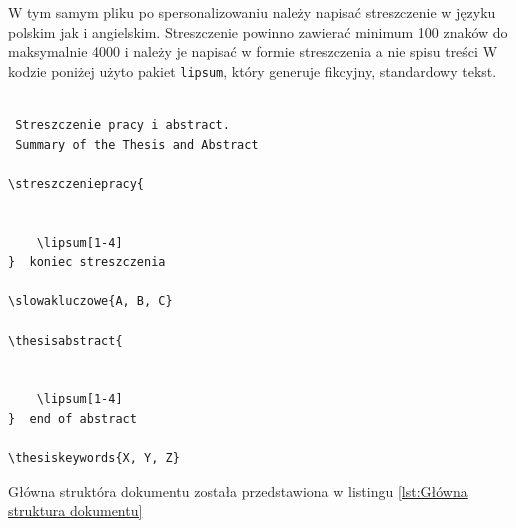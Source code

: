 W tym samym pliku po spersonalizowaniu należy napisać streszczenie w języku polskim jak i angielskim. Streszczenie  powinno zawierać minimum 100 znaków do maksymalnie 4000 i należy je napisać w formie streszczenia a nie spisu treści 
W kodzie poniżej użyto pakiet \texttt{lipsum}, który generuje fikcyjny, standardowy tekst.
\begin{lstlisting}[caption={Miejsce pisania streszczenia pracy}, label=lst:Miejsce pisania streszczenia pracy, firstnumber=47]

 Streszczenie pracy i abstract.
 Summary of the Thesis and Abstract

\streszczeniepracy{

	
	\lipsum[1-4]
}  koniec streszczenia

\slowakluczowe{A, B, C}

\thesisabstract{

	
	\lipsum[1-4]
}  end of abstract

\thesiskeywords{X, Y, Z}
\end{lstlisting}
\vspace{0.5cm}
Główna struktóra dokumentu została przedstawiona w listingu \ref{lst:Główna struktura dokumentu}
